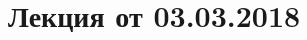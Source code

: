 \section{Лекция от 03.03.2018}
\setcounter{property}{0}
\begin{property}
	
\end{property}
\begin{property}
	
\end{property}
\begin{property}
	
\end{property}
\begin{property}
	
\end{property}
\begin{property}
	
\end{property}
\begin{property}
	
\end{property}